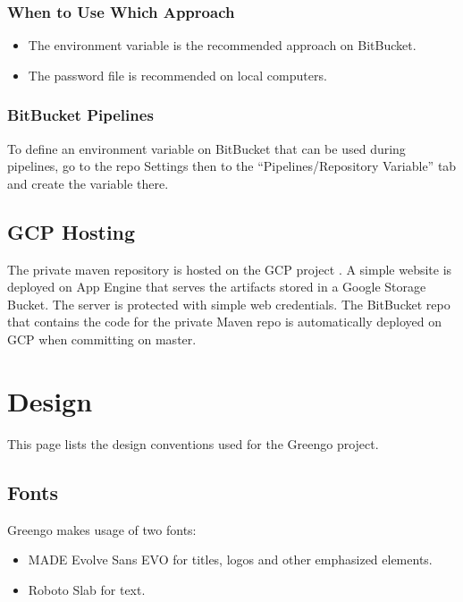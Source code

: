 \documentclass[letterpaper,10pt,english]{sphinxmanual}
\begin{document}
\subsection{When to Use Which Approach}
\label{\detokenize{private_maven_repo:when-to-use-which-approach}}\begin{itemize}
\item {} 
The environment variable is the recommended approach on BitBucket.

\item {} 
The password file is recommended on local computers.

\end{itemize}


\subsection{BitBucket Pipelines}
\label{\detokenize{private_maven_repo:bitbucket-pipelines}}
To define an environment variable on BitBucket that can be used during pipelines, go to the repo Settings then to the “Pipelines/Repository Variable” tab and create the variable there.


\section{GCP Hosting}
\label{\detokenize{private_maven_repo:gcp-hosting}}
The private maven repository is hosted on the GCP project .
A simple website is deployed on App Engine that serves the artifacts stored in a Google Storage Bucket.
The server is protected with simple web credentials.
The BitBucket repo  that contains the code for the private Maven repo is automatically deployed on GCP when committing on master.


\chapter{Design}
\label{\detokenize{design:design}}\label{\detokenize{design::doc}}
This page lists the design conventions used for the Greengo project.


\section{Fonts}
\label{\detokenize{design/fonts:fonts}}\label{\detokenize{design/fonts::doc}}
Greengo makes usage of two fonts:
\begin{itemize}
\item {} 
MADE Evolve Sans EVO for titles, logos and other emphasized elements.

\item {} 
Roboto Slab for text.

\end{itemize}
\end{document}
